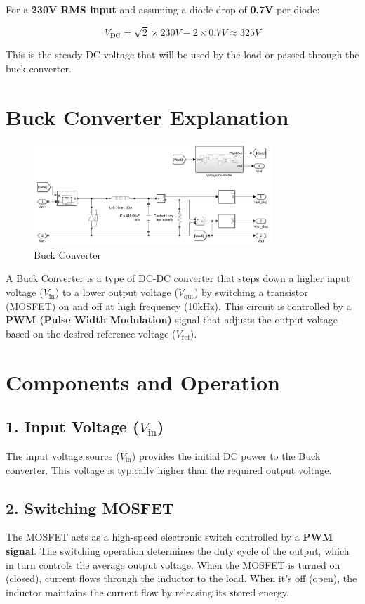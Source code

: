 \documentclass[12pt]{article}
\begin{document}
    For a \textbf{230V RMS input} and assuming a diode drop of \textbf{0.7V} per diode:

    \[
    V_{\text{DC}} = \sqrt{2} \times 230V - 2 \times 0.7V \approx 325V
    \]

    This is the steady DC voltage that will be used by the load or passed through the buck converter.

\section*{Buck Converter Explanation}
\begin{figure}[h]
    \centering
    \includegraphics[width=0.8\textwidth]{img/Buck_Circuit.jpg}
    \caption{Buck Converter}
\end{figure}

A Buck Converter is a type of DC-DC converter that steps down a higher input voltage (\(V_{\text{in}}\)) to a lower output voltage (\(V_{\text{out}}\)) by switching a transistor (MOSFET) on and off at high frequency (10kHz). This circuit is controlled by a \textbf{PWM (Pulse Width Modulation)} signal that adjusts the output voltage based on the desired reference voltage (\(V_{\text{ref}}\)).

\section*{Components and Operation}

\subsection*{1. Input Voltage (\(V_{\text{in}}\))}
The input voltage source (\(V_{\text{in}}\)) provides the initial DC power to the Buck converter. This voltage is typically higher than the required output voltage.

\subsection*{2. Switching MOSFET}
The MOSFET acts as a high-speed electronic switch controlled by a \textbf{PWM signal}. The switching operation determines the duty cycle of the output, which in turn controls the average output voltage. When the MOSFET is turned on (closed), current flows through the inductor to the load. When it’s off (open), the inductor maintains the current flow by releasing its stored energy.
\end{document}
